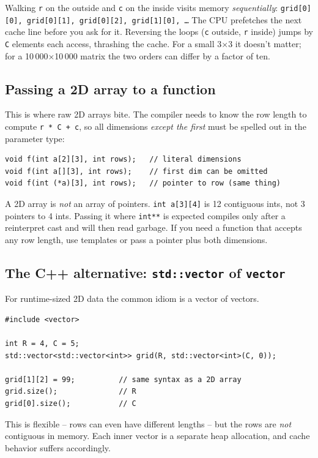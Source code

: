\documentclass[11pt]{article}
\begin{document}
\begin{notebox}
Walking \texttt{r} on the outside and \texttt{c} on the inside visits
memory \emph{sequentially}: \texttt{grid[0][0], grid[0][1], grid[0][2],
grid[1][0], \ldots} The CPU prefetches the next cache line before you
ask for it. Reversing the loops (\texttt{c} outside, \texttt{r} inside)
jumps by \texttt{C} elements each access, thrashing the cache. For a
small 3$\times$3 it doesn't matter; for a 10\,000$\times$10\,000 matrix
the two orders can differ by a factor of ten.
\end{notebox}

\subsection{Passing a 2D array to a function}

This is where raw 2D arrays bite. The compiler needs to know the row
length to compute \texttt{r * C + c}, so all dimensions \emph{except the
first} must be spelled out in the parameter type:

\begin{examplebox}
\begin{verbatim}
void f(int a[2][3], int rows);   // literal dimensions
void f(int a[][3], int rows);    // first dim can be omitted
void f(int (*a)[3], int rows);   // pointer to row (same thing)
\end{verbatim}
\end{examplebox}

\begin{warnbox}
A 2D array is \emph{not} an array of pointers. \texttt{int a[3][4]} is
12 contiguous ints, not 3 pointers to 4 ints. Passing it where
\texttt{int**} is expected compiles only after a reinterpret cast and
will then read garbage. If you need a function that accepts any row
length, use templates or pass a pointer plus both dimensions.
\end{warnbox}

\subsection{The C++ alternative: \texttt{std::vector} of \texttt{vector}}

For runtime-sized 2D data the common idiom is a vector of vectors.

\begin{examplebox}
\begin{verbatim}
#include <vector>

int R = 4, C = 5;
std::vector<std::vector<int>> grid(R, std::vector<int>(C, 0));

grid[1][2] = 99;          // same syntax as a 2D array
grid.size();              // R
grid[0].size();           // C
\end{verbatim}
This is flexible -- rows can even have different lengths -- but the
rows are \emph{not} contiguous in memory. Each inner vector is a
separate heap allocation, and cache behavior suffers accordingly.
\end{examplebox}
\end{document}
